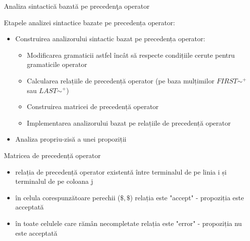 \documentclass[pdf]{beamer}
\begin{document}
\begin{frame}{Analiza sintactică bazată pe precedenţa operator}

Etapele analizei sintactice bazate pe precedența operator:

\begin{itemize}
\item
Construirea analizorului sintactic bazat pe precedența operator:

\begin{itemize}
\item
Modificarea gramaticii astfel încât să respecte condițiile cerute pentru gramaticile operator
\item
Calcularea relațiile de precedență operator (pe baza mulțimilor $FIRST\sim^+$ sau $LAST\sim^+$) 
\item
Construirea matricei de precedență operator
\item
Implementarea analizorului bazat pe relațiile de precedență operator
\end{itemize}

\item
Analiza propriu-zisă a unei propoziții
\end{itemize}

\end{frame}



\begin{frame}{Matricea de precedență operator}

\begin{itemize}
\item
relația de precedență operator existentă între terminalul de pe linia i și terminalul de pe coloana j
\item
în celula corespunzătoare perechii ($\$, \$$) relația este "accept" - propoziția este acceptată
\item
în toate celulele care rămân necompletate relația este "error" - propoziția nu este acceptată
\end{itemize}
\end{frame}
\end{document}
